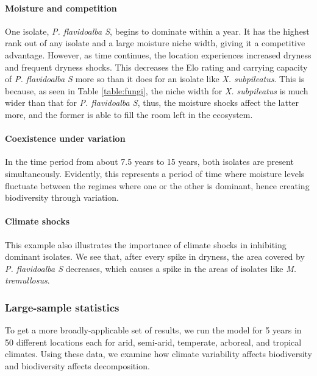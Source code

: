 \documentclass[12pt]{article}
\begin{document}
\paragraph{Moisture and competition}
One isolate, \emph{P. flavidoalba S}, begins to dominate within a year. It has the highest rank out of any isolate and a large moisture niche width, giving it a competitive advantage. However, as time continues, the location experiences increased dryness and frequent dryness shocks. This decreases the Elo rating and carrying capacity of \emph{P. flavidoalba S} more so than it does for an isolate like \emph{X. subpileatus}. This is because, as seen in Table \ref{table:fungi}, the niche width for \emph{X. subpileatus} is much wider than that for \emph{P. flavidoalba S}, thus, the moisture shocks affect the latter more, and the former is able to fill the room left in the ecosystem. %

\paragraph{Coexistence under variation}
In the time period from about 7.5 years to 15 years, both isolates are present simultaneously. Evidently, this represents a period of time where moisture levels fluctuate between the regimes where one or the other is dominant, hence creating biodiversity through variation.

\paragraph{Climate shocks}
This example also illustrates the importance of climate shocks in inhibiting dominant isolates. We see that, after every spike in dryness, the area covered by \emph{P. flavidoalba S} decreases, which causes a spike in the areas of isolates like \emph{M. tremullosus}.



\subsubsection{Large-sample statistics}
To get a more broadly-applicable set of results, we run the model for 5 years in 50 different locations each for arid, semi-arid, temperate, arboreal, and tropical climates. Using these data, we examine how climate variability affects biodiversity and biodiversity affects decomposition.
\end{document}
